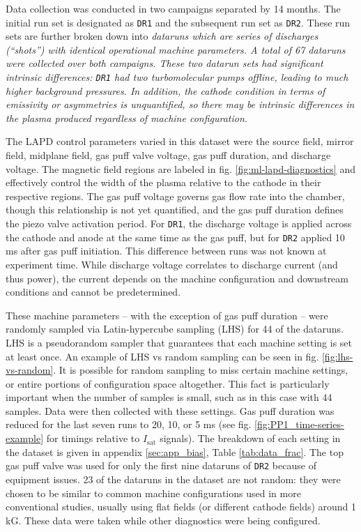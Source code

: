 Data collection was conducted in two campaigns separated by 14 months. The initial run set is designated as \texttt{DR1} and the subsequent run set as \texttt{DR2}. These run sets are further broken down into \em dataruns \em which are series of discharges (``shots'') with identical operational machine parameters. A total of 67 dataruns were collected over both campaigns. These two datarun sets had significant intrinsic differences: \texttt{DR1} had two turbomolecular pumps offline, leading to much higher background pressures. In addition, the cathode condition in terms of emissivity or asymmetries is unquantified, so there may be intrinsic differences in the plasma produced regardless of machine configuration. 

The LAPD control parameters varied in this dataset were the source field, mirror field, midplane field, gas puff valve voltage, gas puff duration, and discharge voltage. The magnetic field regions are labeled in fig. \ref{fig:ml-lapd-diagnostics} and effectively control the width of the plasma relative to the cathode in their respective regions. The gas puff voltage governs gas flow rate into the chamber, though this relationship is not yet quantified, and the gas puff duration defines the piezo valve activation period. For \texttt{DR1}, the discharge voltage is applied across the cathode and anode at the same time as the gas puff, but for \texttt{DR2} applied 10 ms after gas puff initiation. This difference between runs was not known at experiment time. While discharge voltage correlates to discharge current (and thus power), the current depends on the machine configuration and downstream conditions and cannot be predetermined.

These machine parameters -- with the exception of gas puff duration -- were randomly sampled via Latin-hypercube sampling (LHS) for 44 of the dataruns. LHS is a pseudorandom sampler that guarantees that each machine setting is set at least once. An example of LHS vs random sampling can be seen in fig. \ref{fig:lhs-vs-random}. It is possible for random sampling to miss certain machine settings, or entire portions of configuration space altogether. This fact is particularly important when the number of samples is small, such as in this case with 44 samples. Data were then collected with these settings. Gas puff duration was reduced for the last seven runs to 20, 10, or 5 ms (see fig. \ref{fig:PP1_time-series-example} for timings relative to $I_\text{sat}$ signals). The breakdown of each setting in the dataset is given in appendix \ref{sec:app_bias}, Table \ref{tab:data_frac}. The top gas puff valve was used for only the first nine dataruns of \texttt{DR2} because of equipment issues. 23 of the dataruns in the dataset are not random: they were chosen to be similar to common machine configurations used in more conventional studies, usually using flat fields (or different cathode fields) around 1 kG. These data were taken while other diagnostics were being configured.

